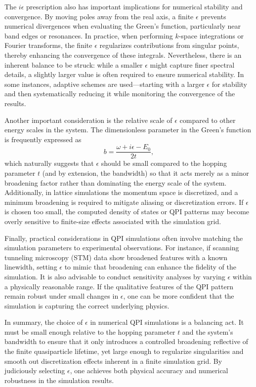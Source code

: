 The $i\epsilon$ prescription also has important implications for numerical stability and convergence. By moving poles away from the real axis, a finite $\epsilon$ prevents numerical divergences when evaluating the Green's function, particularly near band edges or resonances. In practice, when performing $k$-space integrations or Fourier transforms, the finite $\epsilon$ regularizes contributions from singular points, thereby enhancing the convergence of these integrals. Nevertheless, there is an inherent balance to be struck: while a smaller $\epsilon$ might capture finer spectral details, a slightly larger value is often required to ensure numerical stability. In some instances, adaptive schemes are used—starting with a larger $\epsilon$ for stability and then systematically reducing it while monitoring the convergence of the results.

Another important consideration is the relative scale of $\epsilon$ compared to other energy scales in the system. The dimensionless parameter in the Green’s function is frequently expressed as
\[
b = \frac{\omega + i\epsilon - E_0}{2t},
\]
which naturally suggests that $\epsilon$ should be small compared to the hopping parameter $t$ (and by extension, the bandwidth) so that it acts merely as a minor broadening factor rather than dominating the energy scale of the system. Additionally, in lattice simulations the momentum space is discretized, and a minimum broadening is required to mitigate aliasing or discretization errors. If $\epsilon$ is chosen too small, the computed density of states or QPI patterns may become overly sensitive to finite-size effects associated with the simulation grid.

Finally, practical considerations in QPI simulations often involve matching the simulation parameters to experimental observations. For instance, if scanning tunneling microscopy (STM) data show broadened features with a known linewidth, setting $\epsilon$ to mimic that broadening can enhance the fidelity of the simulation. It is also advisable to conduct sensitivity analyses by varying $\epsilon$ within a physically reasonable range. If the qualitative features of the QPI pattern remain robust under small changes in $\epsilon$, one can be more confident that the simulation is capturing the correct underlying physics.

In summary, the choice of $\epsilon$ in numerical QPI simulations is a balancing act. It must be small enough relative to the hopping parameter $t$ and the system's bandwidth to ensure that it only introduces a controlled broadening reflective of the finite quasiparticle lifetime, yet large enough to regularize singularities and smooth out discretization effects inherent in a finite simulation grid. By judiciously selecting $\epsilon$, one achieves both physical accuracy and numerical robustness in the simulation results.

